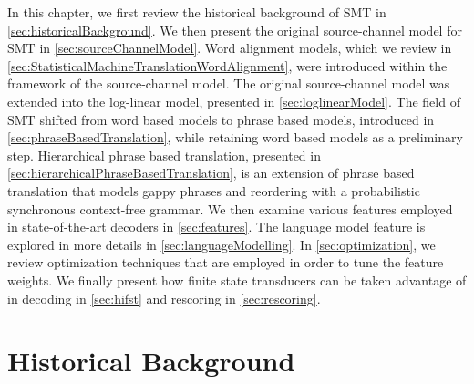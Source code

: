 In this chapter, we first review the historical background of SMT in
\autoref{sec:historicalBackground}.
We then present the original source-channel model for SMT
in \autoref{sec:sourceChannelModel}.
Word alignment models, which we review in
\autoref{sec:StatisticalMachineTranslationWordAlignment},
were introduced within the framework of the source-channel
model. The original source-channel model was extended into the log-linear
model, presented in \autoref{sec:loglinearModel}.
The field of SMT shifted from word based models to phrase based
models, introduced in \autoref{sec:phraseBasedTranslation}, while
retaining word based models as a preliminary step. Hierarchical
phrase based translation, presented in
\autoref{sec:hierarchicalPhraseBasedTranslation}, is an extension
of phrase based translation that models gappy phrases and reordering
with a probabilistic synchronous context-free grammar. We then
examine various features employed in state-of-the-art decoders in
\autoref{sec:features}. The language model feature is explored in
more details in \autoref{sec:languageModelling}. In
\autoref{sec:optimization}, we review optimization techniques that
are employed in order to tune the feature weights. We finally present
how finite state transducers can be taken advantage of in decoding
in \autoref{sec:hifst} and rescoring in \autoref{sec:rescoring}.

\section{Historical Background}
\label{sec:historicalBackground}



